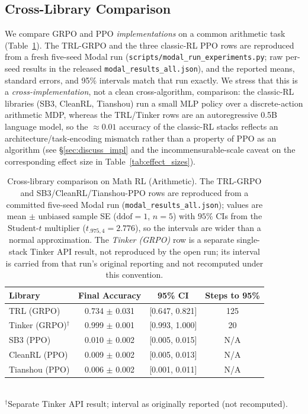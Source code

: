 \documentclass{article}
\begin{document}
\subsection{Cross-Library Comparison}

We compare GRPO and PPO \emph{implementations} on a common arithmetic task
(Table~\ref{tab:results_arithmetic}). The TRL-GRPO and the three classic-RL PPO
rows are reproduced from a fresh five-seed Modal run
(\texttt{scripts/modal\_run\_experiments.py}; raw per-seed results in the
released \texttt{modal\_results\_all.json}), and the reported means, standard
errors, and 95\% intervals match that run exactly. We stress that this is a
\emph{cross-implementation}, not a clean cross-algorithm, comparison: the
classic-RL libraries (SB3, CleanRL, Tianshou) run a small MLP policy over a
discrete-action arithmetic MDP, whereas the TRL/Tinker rows are an
autoregressive 0.5B language model, so the $\approx 0.01$ accuracy of the
classic-RL stacks reflects an architecture/task-encoding mismatch rather than a
property of PPO as an algorithm (see \S\ref{sec:discuss_impl} and the
incommensurable-scale caveat on the corresponding effect size in
Table~\ref{tab:effect_sizes}).

\begin{table}[htbp]
\centering
\caption{Cross-library comparison on Math RL (Arithmetic). The TRL-GRPO and
SB3/CleanRL/Tianshou-PPO rows are reproduced from a committed five-seed Modal run
(\texttt{modal\_results\_all.json}); values are mean $\pm$ unbiased sample SE
($\mathrm{ddof}{=}1$, $n{=}5$) with $95\%$ CIs from the Student-$t$ multiplier
($t_{.975,4}{=}2.776$), so the intervals are wider than a normal approximation.
The \emph{Tinker (GRPO)} row is a separate single-stack Tinker API result, not
reproduced by the open run; its interval is carried from that run's original
reporting and not recomputed under this convention.}
\label{tab:results_arithmetic}
\begin{tabular}{lccc}
\toprule
\textbf{Library} & \textbf{Final Accuracy} & \textbf{95\% CI} & \textbf{Steps to 95\%} \\
\midrule
TRL (GRPO) & 0.734 $\pm$ 0.031 & [0.647, 0.821] & 125 \\
Tinker (GRPO)$^{\dagger}$ & 0.999 $\pm$ 0.001 & [0.993, 1.000] & 20 \\
SB3 (PPO) & 0.010 $\pm$ 0.002 & [0.005, 0.015] & N/A \\
CleanRL (PPO) & 0.009 $\pm$ 0.002 & [0.005, 0.013] & N/A \\
Tianshou (PPO) & 0.006 $\pm$ 0.002 & [0.001, 0.011] & N/A \\
\bottomrule
\end{tabular}
\\[2pt]
{\footnotesize $^{\dagger}$Separate Tinker API result; interval as originally reported (not recomputed).}
\end{table}
\end{document}
